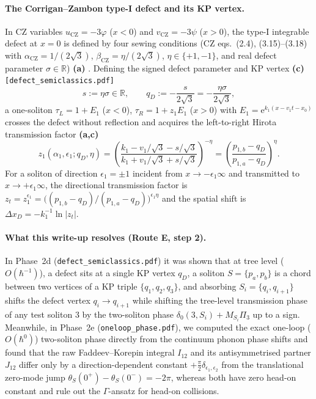 \documentclass[11pt,a4paper]{article}
\newcommand{\ee}{\mathrm{e}}
\newcommand{\hb}{\hbar}
\begin{document}
\paragraph{The Corrigan--Zambon type-I defect and its KP vertex.}
In CZ variables $u_{\mathrm{CZ}} = -3\varphi$ ($x < 0$) and $v_{\mathrm{CZ}} = -3\psi$
($x > 0$), the type-I integrable defect at $x=0$ is defined by four sewing
conditions (CZ eqs.~(2.4), (3.15)--(3.18) with $\alpha_{\mathrm{CZ}} = 1/(2\sqrt{3})$,
$\beta_{\mathrm{CZ}} = \eta/(2\sqrt{3})$, $\eta \in \{+1,-1\}$, and real defect
parameter $\sigma \in \mathbb{R}$) \textbf{(a)} \cite{CZ2023}. Defining the
signed defect parameter and KP vertex \textbf{(c)} \texttt{[defect\_semiclassics.pdf]}
\begin{equation}\label{eq:s_qD}
  s := \eta\sigma \in \mathbb{R}, \qquad
  q_D := -\frac{s}{2\sqrt{3}} = -\frac{\eta\sigma}{2\sqrt{3}},
\end{equation}
a one-soliton $\tau_L = 1 + E_1$ ($x<0$), $\tau_R = 1 + z_1 E_1$ ($x>0$) with
$E_1 = \ee^{k_1(x - v_1 t - x_0)}$ crosses the defect without reflection and
acquires the left-to-right Hirota transmission factor \textbf{(a,c)} \cite{CZ2023}
\begin{equation}\label{eq:z1_sol}
  z_1(\alpha_1,\epsilon_1;q_D,\eta)
  = \left(\frac{k_1 - v_1/\sqrt{3} - s/\sqrt{3}}{k_1 + v_1/\sqrt{3} + s/\sqrt{3}}\right)^{-\eta}
  = \left(\frac{p_{1,b} - q_D}{p_{1,a} - q_D}\right)^{\eta}.
\end{equation}
For a soliton of direction $\epsilon_1 = \pm 1$ incident from $x \to -\epsilon_1\infty$
and transmitted to $x \to +\epsilon_1\infty$, the directional transmission factor
is $z_t = z_1^{\epsilon_1} = \big((p_{1,b}-q_D)/(p_{1,a}-q_D)\big)^{\epsilon_1\eta}$
and the spatial shift is $\Delta x_D = -k_1^{-1}\ln|z_t|$.

\paragraph{What this write-up resolves (Route E, step 2).}
In Phase~2d (\texttt{defect\_semiclassics.pdf}) it was shown that at tree level
($O(\hb^{-1})$), a defect sits at a single KP vertex $q_D$, a soliton $S = \{p_a,p_b\}$
is a chord between two vertices of a KP triple $\{q_1,q_2,q_3\}$, and absorbing
$S_i = \{q_i,q_{i+1}\}$ shifts the defect vertex $q_i \to q_{i+1}$ while shifting
the tree-level transmission phase of any test soliton $3$ by the two-soliton
phase $\delta_0(3,S_i) + M_{S_i}\Pi_3$ up to a sign. Meanwhile, in Phase~2e
(\texttt{oneloop\_phase.pdf}), we computed the exact one-loop ($O(\hb^0)$)
two-soliton phase directly from the continuum phonon phase shifts and found that
the raw Faddeev--Korepin integral $I_{12}$ and its antisymmetrised partner
$J_{12}$ differ only by a direction-dependent constant $+\frac{\pi}{2}\delta_{\epsilon_1,\epsilon_2}$
from the translational zero-mode jump $\theta_S(0^+) - \theta_S(0^-) = -2\pi$,
whereas both have zero head-on constant and rule out the $\Gamma$-ansatz for
head-on collisions.
\end{document}
